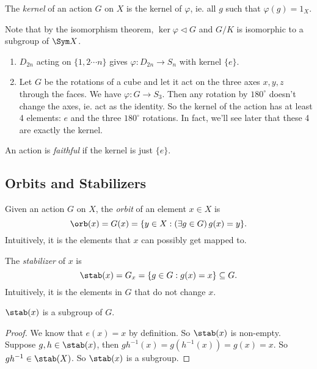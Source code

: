 \documentclass[a4paper]{article}
\begin{document}
\begin{defi}
  The \emph{kernel} of an action $G$ on $X$ is the kernel of $\varphi$, ie. all $g$ such that $\varphi(g) = 1_X$.
\end{defi}
Note that by the isomorphism theorem, $\ker \varphi\lhd G$ and $G/K$ is isomorphic to a subgroup of $\Sym X$.

\begin{eg}\leavevmode
  \begin{enumerate}
    \item $D_{2n}$ acting on $\{1, 2\cdots n\}$ gives $\varphi: D_{2n}\to S_n$ with kernel $\{e\}$.
    \item Let $G$ be the rotations of a cube and let it act on the three axes $x, y, z$ through the faces. We have $\varphi: G\to S_3$. Then any rotation by $180^\circ$ doesn't change the axes, ie. act as the identity. So the kernel of the action has at least 4 elements: $e$ and the three $180^\circ$ rotations. In fact, we'll see later that these 4 are exactly the kernel.
  \end{enumerate}
\end{eg}

\begin{defi}
  An action is \emph{faithful} if the kernel is just $\{e\}$.
\end{defi}

\subsection{Orbits and Stabilizers}
\begin{defi}
  Given an action $G$ on $X$, the \emph{orbit} of an element $x\in X$ is
  \[
    \orb (x) = G(x) = \{y\in X: (\exists g\in G)\,g(x) = y\}.
  \]
  Intuitively, it is the elements that $x$ can possibly get mapped to.
\end{defi}
\begin{defi}
  The \emph{stabilizer} of $x$ is
  \[
    \stab(x) = G_x = \{g\in G: g(x) = x\}\subseteq G.
  \]
  Intuitively, it is the elements in $G$ that do not change $x$.
\end{defi}

\begin{lemma}
  $\stab(x)$ is a subgroup of $G$.
\end{lemma}

\begin{proof}
  We know that $e(x) = x$ by definition. So $\stab(x)$ is non-empty. Suppose $g, h\in \stab(x)$, then $gh^{-1}(x) = g(h^{-1}(x)) = g(x) = x$. So $gh^{-1}\in \stab (X)$. So $\stab (x)$ is a subgroup.
\end{proof}
\end{document}

